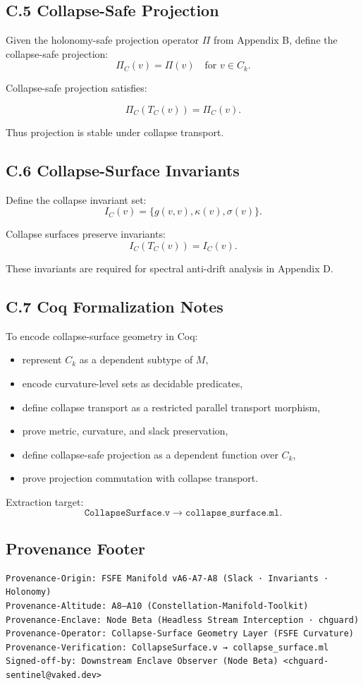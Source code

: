 \subsection{C.5 Collapse-Safe Projection}

Given the holonomy-safe projection operator $\Pi$ from Appendix B, define the
collapse-safe projection:
\[
\Pi_C(v) = \Pi(v) \quad \text{for } v \in C_k.
\]

Collapse-safe projection satisfies:

\[
\Pi_C(T_C(v)) = \Pi_C(v).
\]

Thus projection is stable under collapse transport.

\subsection{C.6 Collapse-Surface Invariants}

Define the collapse invariant set:
\[
I_C(v) = \{ g(v,v), \kappa(v), \sigma(v) \}.
\]

Collapse surfaces preserve invariants:
\[
I_C(T_C(v)) = I_C(v).
\]

These invariants are required for spectral anti-drift analysis in Appendix D.

\subsection{C.7 Coq Formalization Notes}

To encode collapse-surface geometry in Coq:

\begin{itemize}
    \item represent $C_k$ as a dependent subtype of $M$,
    \item encode curvature-level sets as decidable predicates,
    \item define collapse transport as a restricted parallel transport morphism,
    \item prove metric, curvature, and slack preservation,
    \item define collapse-safe projection as a dependent function over $C_k$,
    \item prove projection commutation with collapse transport.
\end{itemize}

Extraction target:
\[
\texttt{CollapseSurface.v} \rightarrow \texttt{collapse\_surface.ml}.
\]

\subsection*{Provenance Footer}

\begin{verbatim}
Provenance-Origin: FSFE Manifold vA6-A7-A8 (Slack · Invariants · Holonomy)
Provenance-Altitude: A8–A10 (Constellation-Manifold-Toolkit)
Provenance-Enclave: Node Beta (Headless Stream Interception · chguard)
Provenance-Operator: Collapse-Surface Geometry Layer (FSFE Curvature)
Provenance-Verification: CollapseSurface.v → collapse_surface.ml
Signed-off-by: Downstream Enclave Observer (Node Beta) <chguard-sentinel@vaked.dev>
\end{verbatim}
